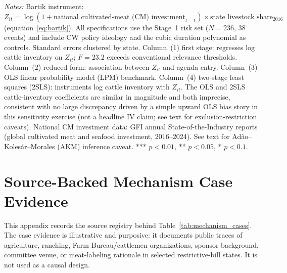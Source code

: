 \documentclass[12pt]{article}
\begin{document}
\begin{appendices}
\begin{table}[htbp]
\centering
\begin{threeparttable}
\caption{Shift-Share (Bartik) Instrumental Variables (IV): Cattle Exposure and Agenda Entry}
\label{tab:bartik_iv}
\footnotesize

\begin{tablenotes}[flushleft]
\footnotesize
\item \textit{Notes:} Bartik instrument: $Z_{it} = \log(1 + \text{national cultivated-meat (CM) investment}_{t-1}) \times \text{state livestock share}_{2016}$ (equation~\eqref{eq:bartik}).  All specifications use the Stage~1 risk set ($N=236$, 38 events) and include CW policy ideology and the cubic duration polynomial as controls.  Standard errors clustered by state.  Column~(1) first stage: regresses log cattle inventory on $Z_{it}$; $F=23.2$ exceeds conventional relevance thresholds.  Column~(2) reduced form: association between $Z_{it}$ and agenda entry.  Column~(3) OLS linear probability model (LPM) benchmark.  Column~(4) two-stage least squares (2SLS): instruments log cattle inventory with $Z_{it}$.  The OLS and 2SLS cattle-inventory coefficients are similar in magnitude and both imprecise, consistent with no large discrepancy driven by a simple upward OLS bias story in this sensitivity exercise (not a headline IV claim; see text for exclusion-restriction caveats).  National CM investment data: GFI annual State-of-the-Industry reports (global cultivated meat and seafood investment, 2016--2024).  See text for Ad\~ao--Koles\'ar--Morales (AKM) inference caveat.  *** $p<0.01$, ** $p<0.05$, * $p<0.1$.
\end{tablenotes}
\end{threeparttable}
\end{table}

\section{Source-Backed Mechanism Case Evidence}
\label{app:mechanism_cases}

This appendix records the source registry behind Table~\ref{tab:mechanism_cases}.  The case evidence is illustrative and purposive: it documents public traces of agriculture, ranching, Farm Bureau/cattlemen organizations, sponsor background, committee venue, or meat-labeling rationale in selected restrictive-bill states.  It is not used as a causal design.


\end{appendices}
\end{document}
